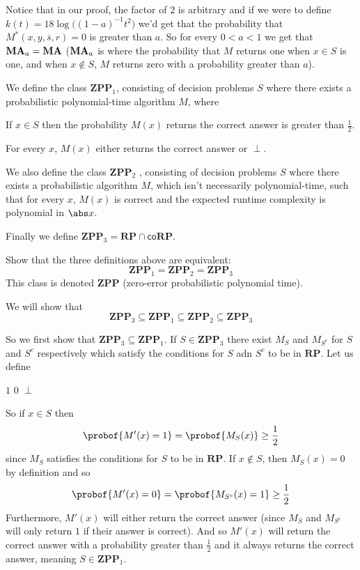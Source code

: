 \documentclass[10pt]{article}
\def\co{\mathsf{co}}
\def\RP{\mathbf{RP}}
\begin{document}
    Notice that in our proof, the factor of $2$ is arbitrary and if we were to define $k(t)=18\log\bigl((1-a)^{-1}t^2\bigr)$ we'd get that the probability that $M^*(x,y,\overline s,r)=0$ is greater than $a$.
    So for every $0<a<1$ we get that $\mathbf{MA}_a=\mathbf{MA}$ ($\mathbf{MA}_a$ is where the probability that $M$ returns one when $x\in S$ is one, and when $x\notin S$, $M$ returns zero with a probability greater than $a$).
\eenum

\def\ZPP{\mathbf{ZPP}}
\begin{defn*}

    We define the class $\ZPP_1$, consisting of decision problems $S$ where there exists a probabilistic polynomial-time algorithm $M$, where
    \benum
        \item If $x\in S$ then the probability $M(x)$ returns the correct answer is greater than $\frac12$.
        \item For every $x$, $M(x)$ either returns the correct answer or $\perp$.
    \eenum

    We also define the class $\ZPP_2$ , consisting of decision problems $S$ where there exists a probabilistic algorithm $M$, which isn't necessarily polynomial-time,
    such that for every $x$, $M(x)$ is correct and the expected runtime complexity is polynomial in $\abs x$.

    Finally we define $\ZPP_3=\RP\cap\co\RP$.

\end{defn*}

\begin{exercise*}

    Show that the three definitions above are equivalent:
    \[ \ZPP_1 = \ZPP_2 = \ZPP_3 \]
    This class is denoted $\ZPP$ (zero-error probabilistic polynomial time).

\end{exercise*}

We will show that
\[ \ZPP_3 \subseteq \ZPP_1 \subseteq \ZPP_2 \subseteq \ZPP_3 \]

So we first show that $\ZPP_3\subseteq\ZPP_1$.
If $S\in\ZPP_3$ there exist $M_S$ and $M_{S^c}$ for $S$ and $S^c$ respectively which satisfy the conditions for $S$ adn $S^c$ to be in $\RP$.
Let us define

\algorithm
         \Return $1$
         \Return $0$
        \State \Return $\perp$
    \EndFunc
\ealgorithm

So if $x\in S$ then
\[ \probof{M'(x)=1} = \probof{M_S(x)} \geq \frac12 \]
since $M_S$ satisfies the conditions for $S$ to be in $\RP$.
If $x\notin S$, then $M_S(x)=0$ by definition and so
\[ \probof{M'(x)=0} = \probof{M_{S^c}(x)=1} \geq \frac12 \]
Furthermore, $M'(x)$ will either return the correct answer (since $M_S$ and $M_{S^c}$ will only return $1$ if their answer is correct).
And so $M'(x)$ will return the correct answer with a probability greater than $\frac12$ and it always returns the correct answer, meaning $S\in\ZPP_1$.
\end{document}
